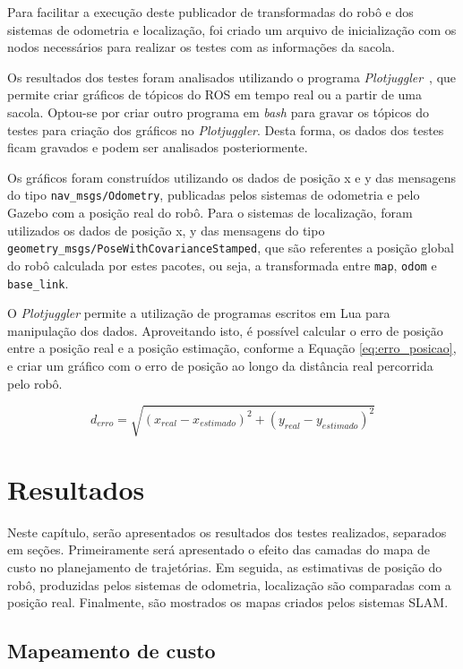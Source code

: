 \documentclass[repeatfields,xlists,xpacks,oneside,yearsonly]{ufrgscca}
\begin{document}
Para facilitar a execução deste publicador de transformadas do robô e
dos sistemas de odometria e localização, foi criado um arquivo de
inicialização com os nodos necessários para realizar os testes com as
informações da sacola.

Os resultados dos testes foram analisados utilizando o programa
\textit{Plotjuggler}~\cite{plotjuggler}, que permite criar gráficos
de tópicos do ROS em tempo real ou a partir de uma sacola. Optou-se
por criar outro programa em \textit{bash} para gravar os tópicos do
testes para criação dos gráficos no \textit{Plotjuggler}. Desta
forma, os dados dos testes ficam gravados e podem ser analisados
posteriormente.

Os gráficos foram construídos utilizando os dados de posição x e y
das mensagens do tipo \texttt{nav\_msgs/Odometry}, publicadas pelos
sistemas de odometria e pelo Gazebo com a posição real do robô. Para
o sistemas de localização, foram utilizados os dados de posição x, y
das mensagens do tipo
\texttt{geometry\_msgs/PoseWithCovarianceStamped}, que são referentes
a posição global do robô calculada por estes pacotes, ou seja, a
transformada entre \texttt{map}, \texttt{odom} e \texttt{base\_link}.

O \textit{Plotjuggler} permite a utilização de programas escritos em
Lua para manipulação dos dados. Aproveitando isto, é possível
calcular o erro de posição entre a posição real e a posição
estimação, conforme a Equação \ref{eq:erro_posicao}, e criar um
gráfico com o erro de posição ao longo da distância real percorrida
pelo robô.

\begin{equation}
    \label{eq:erro_posicao}
    d_{erro} = \sqrt{(x_{real} - x_{estimado})^2 + (y_{real} - y_{estimado})^2}
\end{equation}

\chapter{Resultados}
\label{resultados}

Neste capítulo, serão apresentados os resultados dos testes
realizados, separados em seções. Primeiramente será apresentado o
efeito das camadas do mapa de custo no planejamento de trajetórias.
Em seguida, as estimativas de posição do robô, produzidas pelos
sistemas de odometria, localização são comparadas com a posição real.
Finalmente, são mostrados os mapas criados pelos sistemas SLAM.

\section{Mapeamento de custo}
\end{document}
